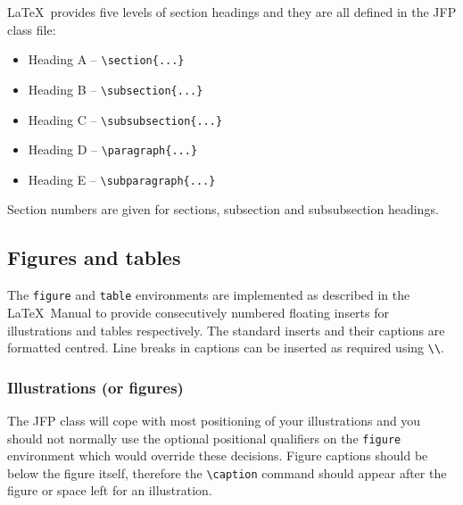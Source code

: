 \documentclass{jfp1}
\begin{document}
\LaTeX\ provides five levels of section headings and they are all
defined in the JFP class file:
\begin{itemize}
  \item[] Heading A -- \verb"\section{...}"
  \item[] Heading B -- \verb"\subsection{...}"
  \item[] Heading C -- \verb"\subsubsection{...}"
  \item[] Heading D -- \verb"\paragraph{...}"
  \item[] Heading E -- \verb"\subparagraph{...}"
\end{itemize}
Section numbers are given for sections, subsection and subsubsection headings.

\subsection{Figures and tables}

The \texttt{figure} and \texttt{table} environments are implemented as described in
the \LaTeX\ Manual to
provide consecutively numbered floating inserts for illustrations and tables
respectively.
The standard inserts and their captions are formatted centred.
Line breaks in captions can be inserted as required using \verb"\\".

\subsubsection{Illustrations (or figures)}

The JFP class will cope with most positioning of your illustrations
and you should not normally use the optional positional qualifiers on
the \verb"figure" environment which would override these decisions.
Figure captions should be below the figure itself, therefore the
\verb"\caption" command should appear after the figure or space left
for an illustration.
\end{document}
